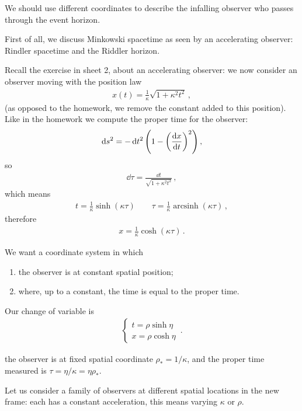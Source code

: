 \documentclass[main.tex]{subfiles}
\begin{document}
We should use different coordinates to describe the infalling observer who passes through the event horizon. 

First of all, we discuss Minkowski spacetime as seen by an accelerating observer: Rindler spacetime and the Riddler horizon. 

Recall the exercise in sheet 2, about an accelerating observer: we now consider an observer moving with the position law 
%
\begin{align}
  x(t) = \frac{1}{\kappa } \sqrt{1 + \kappa^2t^2}
\,,
\end{align}
%
(as opposed to the homework, we remove the constant added to this position).
Like in the homework we compute the proper time for the observer: 
%
\begin{align}
  \dd{s^2} = - \dd{t^2} \qty(1 - \qty(\dv{x}{t})^2)
\,,
\end{align}
%
so 
%
\begin{align}
  \dd{\tau} = \frac{ \dd{t}}{\sqrt{1 + \kappa^2t^2}}
\,,
\end{align}
%
which means 
%
\begin{align}
t = \frac{1}{\kappa } \operatorname{sinh} (\kappa \tau )
    \qquad 
\tau  = \frac{1}{\kappa } \operatorname{arcsinh} (\kappa \tau )
\,,
\end{align}
%
therefore 
%
\begin{align}
  x = \frac{1}{\kappa } \cosh(\kappa \tau )
\,.
\end{align}
%

We want a coordinate system in which 
\begin{enumerate}
    \item the observer is at constant spatial position;
    \item where, up to a constant, the time is equal to the proper time.
\end{enumerate}

Our change of variable is 
%
\begin{align}
  \begin{cases}
      t = \rho \sinh \eta  \\
      x = \rho \cosh \eta 
  \end{cases}
\,.
\end{align}
%

the observer is at fixed spatial coordinate \(\rho_{*} = 1 / \kappa \), and the proper time measured is \(\tau = \eta / \kappa = \eta \rho_{*}\). 

Let us consider a family of observers at different spatial locations in the new frame: each has a constant acceleration, this means varying \(\kappa \) or \(\rho \).
\end{document}
